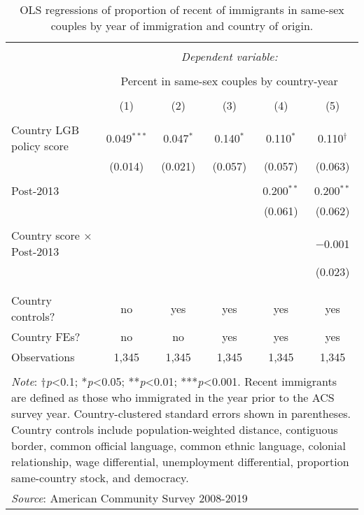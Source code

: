 \documentclass[
  11pt,
]{article}
\begin{document}
\begin{table}[H] \centering 
  \caption{OLS regressions of proportion of recent of immigrants in same-sex couples by year of immigration and country of origin.} 
  \label{tab:country-props-pastyear} 
\begin{tabular}{@{\extracolsep{5pt}}lccccc} 
\\[-1.8ex]\hline 
\hline \\[-1.8ex] 
 & \multicolumn{5}{c}{\textit{Dependent variable:}} \\ 
\cline{2-6} 
\\[-1.8ex] & \multicolumn{5}{c}{Percent in same-sex couples by country-year} \\ 
\\[-1.8ex] & (1) & (2) & (3) & (4) & (5)\\ 
\hline \\[-1.8ex] 
 Country LGB policy score & 0.049$^{***}$ & 0.047$^{*}$ & 0.140$^{*}$ & 0.110$^{*}$ & 0.110$^{†}$ \\ 
  & (0.014) & (0.021) & (0.057) & (0.057) & (0.063) \\ 
  & & & & & \\ 
 Post-2013 &  &  &  & 0.200$^{**}$ & 0.200$^{**}$ \\ 
  &  &  &  & (0.061) & (0.062) \\ 
  & & & & & \\ 
 Country score × Post-2013 &  &  &  &  & $-$0.001 \\ 
  &  &  &  &  & (0.023) \\ 
  & & & & & \\ 
\hline \\[-1.8ex] 
Country controls? & no & yes & yes & yes & yes \\ 
Country FEs? & no & no & yes & yes & yes \\ 
Observations & 1,345 & 1,345 & 1,345 & 1,345 & 1,345 \\ 
\hline 
\hline \\[-1.8ex] 
\multicolumn{6}{l}{\parbox[t]{.8\textwidth}{\textit{Note}: †\textit{p}<0.1; *\textit{p}<0.05; **\textit{p}<0.01; ***\textit{p}<0.001. Recent immigrants are defined as those who immigrated in the year prior to the ACS survey year. Country-clustered standard errors shown in parentheses. Country controls include population-weighted distance, contiguous border, common official language, common ethnic language, colonial relationship, wage differential, unemployment differential, proportion same-country stock, and democracy.}} \\ 
\multicolumn{6}{l}{\textit{Source}: American Community Survey 2008-2019} \\ 
\end{tabular} 
\end{table}
\end{document}
